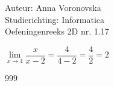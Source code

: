 \documentclass[a4paper]{article}
\begin{document}
\noindent \large Auteur: Anna Voronovska \\
\noindent \large Studierichting: Informatica \\
\noindent \large Oefeningenreeks 2D nr. 1.17 \\

\bigskip 

\normalsize

$\lim\limits_{x \to 4} \dfrac{x}{x - 2} = \dfrac{4}{4 - 2} = \dfrac{4}{2} = 2$


\begin{thebibliography}{999}
\end{thebibliography}
\end{document}
